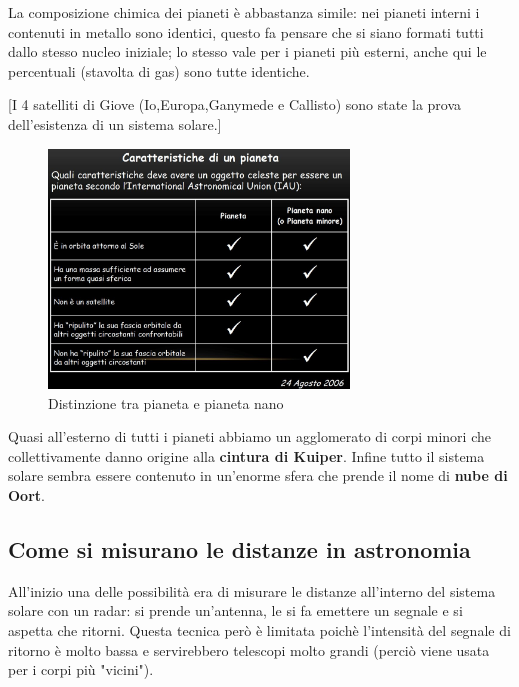 \documentclass[a4paper,11pt]{article}
\begin{document}
La composizione chimica dei pianeti è abbastanza simile: nei pianeti interni i contenuti in metallo sono identici, questo fa pensare che si siano formati tutti dallo stesso nucleo iniziale; lo stesso vale per i pianeti più esterni, anche qui le percentuali (stavolta di gas) sono tutte identiche.

[I 4 satelliti di Giove (Io,Europa,Ganymede e Callisto) sono state la prova dell'esistenza di un sistema solare.]
\begin{figure}[h!!]
        \centering
        \includegraphics[width=8cm]{Caratteristiche di un pianeta.JPG}
        \caption{Distinzione tra pianeta e pianeta nano}
        \label{fig:Correnti parassite}
    \end{figure}

Quasi all'esterno di tutti i pianeti abbiamo un agglomerato di corpi minori che collettivamente danno origine alla \textbf{cintura di Kuiper}. Infine tutto il sistema solare sembra essere contenuto in un'enorme sfera che prende il nome di \textbf{nube di Oort}. 

\subsection{Come si misurano le distanze in astronomia}
All'inizio una delle possibilità era di misurare le distanze all'interno del sistema solare con un radar: si prende un'antenna, le si fa emettere un segnale e si aspetta che ritorni. Questa tecnica però è limitata poichè l'intensità del segnale di ritorno è molto bassa e servirebbero telescopi molto grandi (perciò viene usata per i corpi più "vicini").
\end{document}
